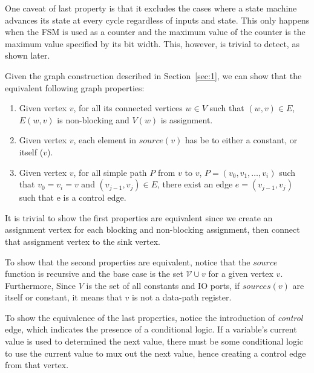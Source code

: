 \documentclass{article}
\begin{document}
One caveat of last property is that it excludes the cases where a state machine
advances its state at every cycle regardless of inputs and state. This only happens
when the FSM is used as a counter and the maximum value of the counter is the maximum
value specified by its bit width. This, however, is trivial to detect, as shown
later.

Given the graph construction described in Section~\ref{sec:1}, we can show that the
equivalent following graph properties:
\begin{enumerate}
    \item Given vertex $v$, for all its connected vertices $w \in V$ such that
    $(w, v) \in E$, $E(w, v)$ is non-blocking and $V(w)$ is assignment.
    \item Given vertex $v$, each element in $source(v)$ has be to either a constant,
    or itself ($v$).
    \item Given vertex $v$, for all simple path $P$ from $v$ to $v$,
    $P = (v_0, v_1, \dots, v_i)$ such that $v_0 = v_i = v$ and $(v_{j-1}, v_{j}) \in E$,
    there exist an edge $e = (v_{j-1}, v_j)$ such that e is a control edge.
\end{enumerate}

It is trivial to show the first properties are equivalent since we create an assignment
vertex for each blocking and non-blocking assignment, then connect that assignment vertex
to the sink vertex.

To show that the second properties are equivalent, notice that the $source$ function
is recursive and the base case is the set $\mathcal{V} \cup v$ for a given vertex
$v$. Furthermore, Since $V$ is the set of all constants and IO ports, if $sources(v)$ are itself
or constant, it means that $v$ is not a data-path register.

To show the equivalence of the last properties, notice the introduction of \textit{control}
edge, which indicates the presence of a conditional logic. If a variable's current value
is used to determined the next value, there must be some conditional logic to use the
current value to mux out the next value, hence creating a control edge from that vertex.
\end{document}
